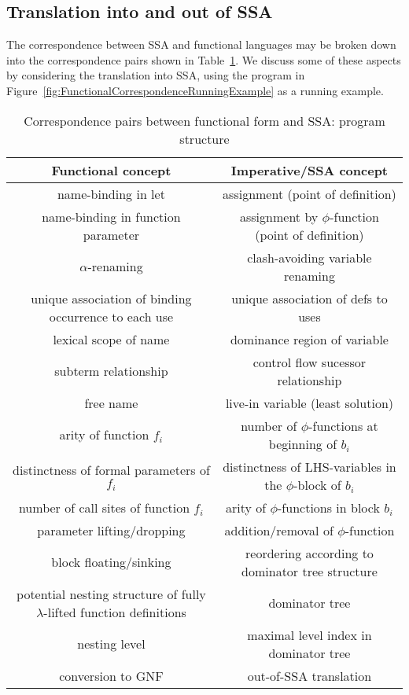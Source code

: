 \subsection{Translation into and out of SSA}

The correspondence between SSA and functional languages may be broken
down into the correspondence pairs shown in
Table~\ref{tableFunctionalCorrespondencesI}. We discuss some of these
aspects by considering the translation into SSA, using the program in
Figure~\ref{fig:FunctionalCorrespondenceRunningExample} as a running
example.

\begin{table}
\begin{tabular}{|c|c|}
  \hline Functional concept & Imperative/SSA concept\\ 
  \hline \hline
  name-binding in let & assignment (point of definition)\\
  name-binding in function parameter & assignment by $\phi$-function
  (point of definition)\\ 
  $\alpha$-renaming & clash-avoiding variable renaming\\
  unique association of binding occurrence to each use & unique
  association of defs to uses\\ 
  lexical scope of name & dominance
  region of variable\\ 
  subterm relationship & control flow sucessor relationship\\
  free name & live-in variable (least
  solution)\\ 
  arity of function $f_i$ & number of
  $\phi$-functions at beginning of $b_i$\\ 
  distinctness of formal
  parameters of $f_i$ & distinctness of LHS-variables in the
  $\phi$-block of $b_i$\\ 
  number of call sites of function $f_i$ &
  arity of $\phi$-functions in block $b_i$\\ 
  parameter lifting/dropping & addition/removal of $\phi$-function\\ 
  block floating/sinking & reordering according to dominator tree
  structure\\
  potential nesting structure of fully $\lambda$-lifted
  function definitions & dominator tree\\
  nesting level & maximal
  level index in dominator tree\\
  conversion to GNF & out-of-SSA translation\\
  \hline
\end{tabular}
\caption{\label{tableFunctionalCorrespondencesI}
  Correspondence pairs between functional form and SSA: program structure}
\end{table}

